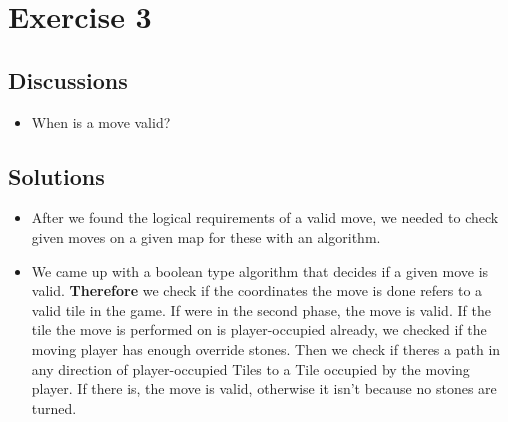 \section{Exercise 3}
\subsection{Discussions}
\begin{itemize}
    \item When is a move valid?  
\end{itemize}
\subsection{Solutions}
\begin{itemize}
    \item After we found the logical requirements of a valid move, we needed to check given moves on a given map for these with an algorithm.
    \item We came up with a boolean type algorithm that decides if a given move is valid.
    \textbf{Therefore} we check if the coordinates the move is done refers to a valid tile in the game. If were in the second phase, the move is valid. If the tile the move is performed on is player-occupied already, we checked if the moving player has enough override stones. Then we check if theres a path in any direction of player-occupied Tiles to a Tile occupied by the moving player. If there is, the move is valid, otherwise it isn't because no stones are turned.
\end{itemize}